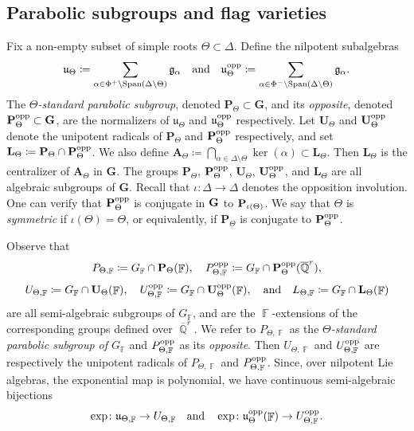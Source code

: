 \documentclass{amsart}
\theoremstyle{plain}
\theoremstyle{definition}
\DeclareMathOperator{\Span}{Span}
\DeclareMathOperator{\Fb}{{\mathbb{F}}}
\DeclareMathOperator{\Qb}{\mathbb{Q}}
\newcommand{\1}{\mathbf{1}}
\begin{document}
\subsection{Parabolic subgroups and flag varieties}
\label{sec: flag}
Fix a non-empty subset of simple roots $\Theta\subset \Delta$. Define the nilpotent subalgebras
\begin{align}\label{equation: u} \mathfrak u_\Theta\coloneqq \sum_{\alpha\in\Phi^+\setminus\Span(\Delta\setminus\Theta)}\mathfrak g_\alpha\quad\text{and}\quad\mathfrak u_\Theta^{\rm opp}\coloneqq\sum_{\alpha\in\Phi^-\setminus\Span(\Delta\setminus\Theta)}\mathfrak g_\alpha.\end{align}
The \emph{$\Theta$-standard parabolic subgroup}, denoted $\mathbf P_\Theta\subset\mathbf G$, and its \emph{opposite}, denoted $\mathbf P_\Theta^{\rm opp}\subset\mathbf G$, are the normalizers of $\mathfrak u_\Theta$ and $\mathfrak u_\Theta^{\rm opp}$ respectively. Let $\mathbf U_\Theta$ and $\mathbf U_\Theta^{\rm opp}$ denote the unipotent radicals of $\mathbf P_\Theta$ and $\mathbf P_\Theta^{\rm opp}$ respectively, and set $\mathbf L_\Theta\coloneqq \mathbf P_\Theta\cap\mathbf P_\Theta^{\rm opp}$. We also define $\mathbf A_\Theta \coloneqq \bigcap_{\alpha \in \Delta \setminus \Theta} \ker(\alpha) \subset \mathbf L_\Theta$.
Then $\mathbf{L}_\Theta$ is the centralizer of $\mathbf{A}_\Theta$ in $\mathbf{G}$. The groups $\mathbf P_\Theta$, $\mathbf P_\Theta^{\rm opp}$, $\mathbf U_\Theta$, $\mathbf U_\Theta^{\rm opp}$, and $\mathbf L_\Theta$ are all algebraic subgroups of $\mathbf G$. Recall that $\iota:\Delta\to\Delta$ denotes the opposition involution. One can verify that ${\bf P}_\Theta^{\rm opp}$ is conjugate in ${\bf G}$ to ${\bf P}_{\iota(\Theta)}$. We say that $\Theta$ is \emph{symmetric} if $\iota(\Theta)=\Theta$, or equivalently, if $\mathbf P_{\Theta}$ is conjugate to $\mathbf P_{\Theta}^{\rm opp}$. 

Observe that
\[P_{\Theta,\Fb}\coloneqq G_{\Fb} \cap \mathbf P_\Theta(\Fb),\quad P_{\Theta,\Fb}^{\rm opp}\coloneqq G_{\Fb} \cap \mathbf P_\Theta^{\rm opp}(\overline{\Qb}^r),\]
\[U_{\Theta,\Fb} \coloneqq G_{\Fb}\cap \mathbf U_\Theta(\Fb),\quad U_{\Theta,\Fb}^{\rm opp}\coloneqq G_{\Fb} \cap \mathbf U_\Theta^{\rm opp}(\Fb),\quad\text{and}\quad L_{\Theta,\Fb}\coloneqq G_{\Fb}\cap \mathbf L_\Theta(\Fb)\]  are all semi-algebraic  subgroups of $G_{\Fb}$, and are the $\Fb$-extensions of the corresponding groups defined over $\overline{\Qb}^r$. We refer to $P_{\Theta,\Fb}$ as the \emph{$\Theta$-standard parabolic subgroup of $G_{\Fb}$} and $P_{\Theta,\Fb}^{\rm opp}$ as its \emph{opposite}. Then $U_{\Theta,\Fb}$ and $U_{\Theta,\Fb}^{\rm opp}$ are respectively the unipotent radicals of $P_{\Theta,\Fb}$ and $P_{\Theta,\Fb}^{\rm opp}$. Since, over nilpotent Lie algebras, the exponential map is polynomial, we have continuous semi-algebraic bijections \[\exp \colon \mathfrak u_{\Theta,\Fb}\to U_{\Theta,\Fb}\quad\text{and}\quad\exp\colon\mathfrak u_\Theta^{\rm opp}(\Fb)\to U_{\Theta,\Fb}^{\rm opp}.\]
\end{document}
